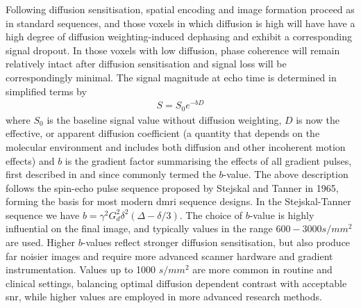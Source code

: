 Following diffusion sensitisation, spatial encoding and image formation proceed as in standard sequences, and those voxels in which diffusion is high will have have a high degree of diffusion weighting-induced dephasing and exhibit a corresponding signal dropout.
In those voxels with low diffusion, phase coherence will remain relatively intact after diffusion sensitisation and signal loss will be correspondingly minimal.
The signal magnitude at echo time is determined in simplified terms by
\begin{align}
    S = S_0e^{-bD}
\end{align}\label{eq:S}
where $S_0$ is the baseline signal value without diffusion weighting, $D$ is now the effective, or apparent diffusion coefficient\autocite{Basser1994,Beaulieu2002} (a quantity that depends on the molecular environment and includes both diffusion and other incoherent motion effects) and $b$ is the gradient factor summarising the effects of all gradient pulses, first described in \textcite{LeBihan1986} and since commonly termed the $b$-value.
The above description follows the spin-echo pulse sequence proposed by Stejskal and Tanner in 1965\autocite{Stejskal1965}, forming the basis for most modern \gls{dmri} sequence designs.
In the Stejskal-Tanner sequence we have $b = \gamma^2 G_d^2 \delta^2 (\Delta-\delta/3)$.
The choice of $b$-value is highly influential on the final image, and typically values in the range $600-3000 s/mm^2$ are used.
Higher $b$-values reflect stronger diffusion sensitisation, but also produce far noisier images and require more advanced scanner hardware and gradient instrumentation.
Values up to 1000 $s/mm^2$ are more common in routine and clinical settings, balancing optimal diffusion dependent contrast with acceptable \gls{snr}, while higher values are employed in more advanced research methods.\autocite{Roberts2007}

